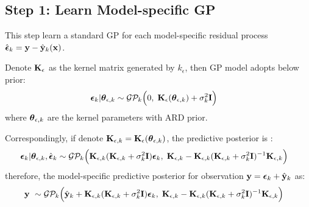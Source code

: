 \documentclass[11pt]{article}
\theoremstyle{definition}
\begin{document}
\subsection{\textbf{Step 1: Learn Model-specific GP}}
This step learn a standard GP  for each model-specific residual process $\hat{\boldsymbol{\epsilon}}_k = {\bf y} - \hat{{\bf y}}_k({\bf x})$. \\

Denote ${\bf K}_\epsilon$ as the kernel matrix generated by $k_\epsilon$, then GP model adopts below prior:
\begin{align*}
\boldsymbol{\epsilon}_k | \boldsymbol{\theta}_{\epsilon, k} &\sim {\cal G}{\cal P}_k \Big(0, \; {\bf K}_{\epsilon}(\boldsymbol{\theta}_{\epsilon, k}) + \sigma_k^2{\bf I} \Big)
\end{align*}
where $\boldsymbol{\theta}_{\epsilon, k}$ are the kernel parameters with ARD prior. 

Correspondingly, if denote ${\bf K}_{\epsilon,k} = {\bf K}_{\epsilon}(\boldsymbol{\theta}_{\epsilon, k})$, the predictive posterior is \citep{rasmussen_gaussian_2006}:
\begin{align*}
\boldsymbol{\epsilon}_k | \boldsymbol{\theta}_{\epsilon, k}, \hat{\boldsymbol{\epsilon}}_k &\sim {\cal G}{\cal P}_k \Big({\bf K}_{\epsilon,k}({\bf K}_{\epsilon,k} + \sigma_k^2{\bf I})\boldsymbol{\epsilon}_k, \; {\bf K}_{\epsilon,k} - {\bf K}_{\epsilon,k}({\bf K}_{\epsilon,k} + \sigma_k^2{\bf I})^{-1}{\bf K}_{\epsilon,k} \Big)
\end{align*}
therefore, the model-specific predictive posterior for observation ${\bf y} = \boldsymbol{\epsilon}_k + \hat{{\bf y}}_k$ as:
\begin{align*}
{\bf y} ~ &\sim {\cal G}{\cal P}_k \Big(\hat{{\bf y}}_k + {\bf K}_{\epsilon,k}({\bf K}_{\epsilon,k} + \sigma_k^2{\bf I})\boldsymbol{\epsilon}_k, \; {\bf K}_{\epsilon,k} - {\bf K}_{\epsilon,k}({\bf K}_{\epsilon,k} + \sigma_k^2{\bf I})^{-1}{\bf K}_{\epsilon,k} \Big)
\end{align*}
\end{document}
